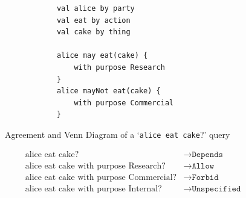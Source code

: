 \begin{figure}[h]
    \centering
    \begin{minipage}{0.5\textwidth}
        \begin{verbatim}
            val alice by party
            val eat by action
            val cake by thing

            alice may eat(cake) {
                with purpose Research
            }
            alice mayNot eat(cake) {
                with purpose Commercial
            }
        \end{verbatim}
    \end{minipage}

    \vspace{0.2cm}


    \caption{Agreement and Venn Diagram of a `\texttt{alice eat cake}?' query}
    \label{fig:allowance-venn}
\end{figure}

\begin{align}
    \label{eq:allowance-cake-example}
    \text{alice eat cake?} &\to \texttt{Depends}\\
    \text{alice eat cake with purpose Research?} &\to \texttt{Allow}\\
    \text{alice eat cake with purpose Commercial?} &\to \texttt{Forbid}\\
    \text{alice eat cake with purpose Internal?} &\to \texttt{Unspecified}
\end{align}


